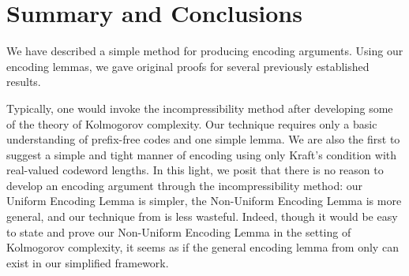 \documentclass[prodmode,acmcsur]{acmsmall}
\begin{document}
\section{Summary and Conclusions}

We have described a simple method for producing encoding
arguments. Using our encoding lemmas, we gave original proofs for
several previously established results.

Typically, one would invoke the incompressibility method after
developing some of the theory of Kolmogorov complexity. Our technique
requires only a basic understanding of prefix-free codes and one
simple lemma. We are also the first to suggest a simple and tight
manner of encoding using only Kraft's condition with real-valued
codeword lengths. In this light, we posit that there is no reason to
develop an encoding argument through the incompressibility method: our
Uniform Encoding Lemma is simpler, the Non-Uniform Encoding Lemma is
more general, and our technique from  is less
wasteful. Indeed, though it would be easy to state and prove our
Non-Uniform Encoding Lemma in the setting of Kolmogorov complexity, it
seems as if the general encoding lemma from  only can exist
in our simplified framework.

\end{document}
